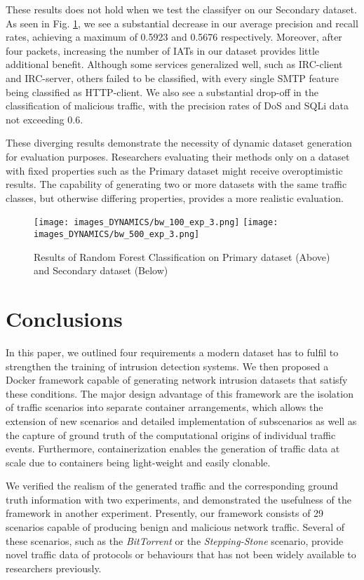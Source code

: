 These results does not hold when we test the classifyer on our Secondary dataset. As seen in Fig. \ref{Fig:Primary}, we see a substantial decrease in our average precision and recall rates, achieving a maximum of 0.5923 and 0.5676 respectively. Moreover, after four packets, increasing the number of IATs in our dataset provides little additional benefit. Although some services generalized well, such as IRC-client and IRC-server, others failed to be classified, with every single SMTP feature being classified as HTTP-client. We also see a substantial drop-off in the classification of malicious traffic, with the precision rates of DoS and SQLi data not exceeding 0.6.

These diverging results demonstrate the necessity of dynamic dataset generation for evaluation purposes. Researchers evaluating their methods only on a dataset with fixed properties such as the Primary dataset might receive overoptimistic results. The capability of generating two or more datasets with the same traffic classes, but otherwise differing properties, provides a more realistic evaluation.


\begin{figure}[ht!]
\centering
 \texttt{[image: images\_DYNAMICS/bw\_100\_exp\_3.png]}
 \texttt{[image: images\_DYNAMICS/bw\_500\_exp\_3.png]}
\caption{Results of Random Forest Classification on Primary dataset (Above) and Secondary dataset (Below)}
\label{Fig:Primary}
\end{figure}


\section{Conclusions}\label{Sec:Conclusion}

In this paper, we outlined four requirements a modern dataset has to fulfil to strengthen the training of intrusion detection systems. We then proposed a Docker framework capable of generating network intrusion datasets that satisfy these conditions. The major design advantage of this framework are the isolation of traffic scenarios into separate container arrangements, which allows the extension of new scenarios and detailed implementation of subscenarios as well as the capture of ground truth of the computational origins of individual traffic events. Furthermore, containerization enables the generation of traffic data at scale due to containers being light-weight and easily clonable.

We verified the realism of the generated traffic and the corresponding ground truth information with two experiments, and demonstrated the usefulness of the framework in another experiment.
Presently, our framework consists of 29 scenarios capable of producing benign and malicious network traffic. Several of these scenarios, such as the \emph{BitTorrent} or the \emph{Stepping-Stone} scenario, provide novel traffic data of protocols or behaviours that has not been widely available to researchers previously.



